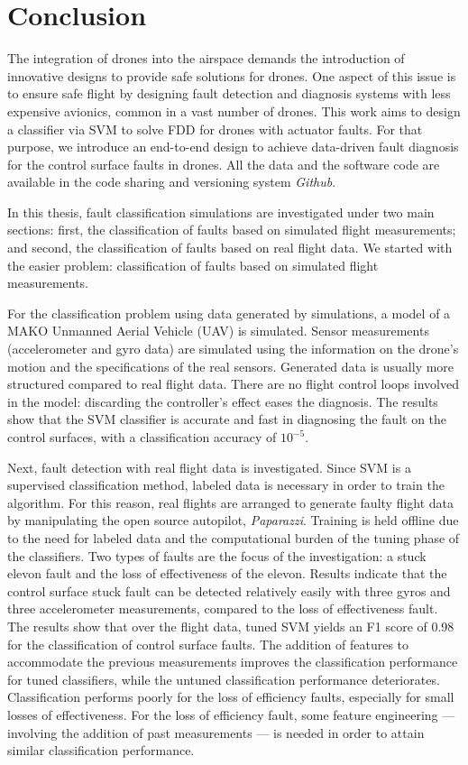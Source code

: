 \chapter{Conclusion}

The integration of drones into the airspace demands the introduction of innovative designs to provide safe solutions for drones. One aspect of this issue is to ensure safe flight by designing fault detection and diagnosis systems with less expensive avionics, common in a vast number of drones.
This work aims to design a classifier via SVM to solve FDD for drones with actuator faults.
For that purpose, we introduce an end-to-end design to achieve data-driven fault diagnosis for the control surface faults in drones.
All the data and the software code are available in the code sharing and versioning system \emph{Github}. 

In this thesis, fault classification simulations are investigated under two main sections: first, the classification of faults based on simulated flight measurements; and second, the classification of faults based on real flight data. We started with the easier problem: classification of faults based on simulated flight measurements.

For the classification problem using data generated by simulations, a model of a MAKO Unmanned Aerial Vehicle (UAV) is simulated.
Sensor measurements (accelerometer and gyro data) are simulated using the information on the drone's motion and the specifications of the real sensors. 
Generated data is usually more structured compared to real flight data.
There are no flight control loops involved in the model: discarding the controller's effect eases the diagnosis. 
The results show that the SVM classifier is accurate and fast in diagnosing the fault on the control surfaces, with a classification accuracy of $10^{-5}$.

Next, fault detection with real flight data is investigated. 
Since SVM is a supervised classification method, labeled data is necessary in order to train the algorithm. For this reason, real flights are arranged to generate faulty flight data by manipulating the open source autopilot, \emph{Paparazzi}.  
Training is held offline due to the need for labeled data and the computational burden of the tuning phase of the classifiers. 
Two types of faults are the focus of the investigation: a stuck elevon fault and the loss of effectiveness of the elevon. 
Results indicate that the control surface stuck fault can be detected relatively easily with three gyros and three accelerometer measurements, compared to the loss of effectiveness fault. 
The results show that over the flight data, tuned SVM yields an F1 score of 0.98 for the classification of control surface faults. 
The addition of features to accommodate the previous measurements improves the classification performance for tuned classifiers, while the untuned classification performance deteriorates. 
Classification performs poorly for the loss of efficiency faults, especially for small losses of effectiveness. 
For the loss of efficiency fault, some feature engineering --- involving the addition of past measurements --- is needed in order to attain similar classification performance. 

